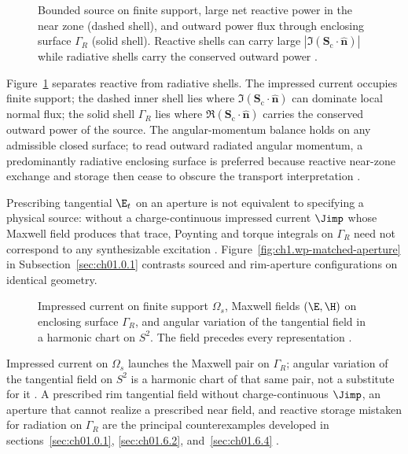 \begin{figure}[t]
\centering
\VolIPhysFig{\VolIPhysReactiveVsRadiative}
\caption{Bounded source on finite support, large net reactive power in the near zone (dashed shell), and outward power flux through enclosing surface $\Gamma_R$ (solid shell). Reactive shells can carry large $|\Im(\mathbf{S}_\mathrm{c}\cdot\hat{\mathbf{n}})|$ while radiative shells carry the conserved outward power \cite{poynting1884,chu1948}.}
\label{fig:ch1.master-philosophy}
\end{figure}

Figure~\ref{fig:ch1.master-philosophy} separates reactive from radiative shells.
The impressed current occupies finite support; the dashed inner shell lies where
$\Im(\mathbf{S}_\mathrm{c}\cdot\hat{\mathbf{n}})$ can dominate local normal
flux; the solid shell $\Gamma_R$ lies where
$\Re(\mathbf{S}_\mathrm{c}\cdot\hat{\mathbf{n}})$ carries the conserved outward power of the
source. The angular-momentum balance holds on any admissible closed surface; to read outward radiated angular momentum, a predominantly radiative enclosing surface is preferred because reactive near-zone exchange and storage then cease to obscure the transport interpretation \cite{chu1948,stratton1941}.

Prescribing tangential $\E_t$ on an aperture is not equivalent to specifying a physical source: without a charge-continuous impressed current $\Jimp$ whose Maxwell field produces that trace, Poynting and torque integrals on $\Gamma_R$ need not correspond to any synthesizable excitation \cite{stratton1941,harrington2001}. Figure~\ref{fig:ch1.wp-matched-aperture} in Subsection~\ref{sec:ch01.0.1} contrasts sourced and rim-aperture configurations on identical geometry.
\label{thm:ch1.realizability-hierarchy}\label{prin:ch1.rep-physics}\label{def:ch1.hierarchy-classes}\label{hier:ch1.angular-status}

\begin{figure}[t]
\centering
\VolIPhysFig{\VolIPhysThreeLevelHierarchy}
\caption{Impressed current on finite support $\Omega_s$, Maxwell fields $(\E,\H)$ on enclosing surface $\Gamma_R$, and angular variation of the tangential field in a harmonic chart on $S^2$. The field precedes every representation \cite{stratton1941}.}
\label{fig:ch1.three-level-hierarchy}
\end{figure}

Impressed current on $\Omega_s$ launches the Maxwell pair on $\Gamma_R$; angular variation of the tangential field on $S^2$ is a harmonic chart of that same pair, not a substitute for it \cite{stratton1941,harrington2001}.
A prescribed rim tangential field without charge-continuous $\Jimp$, an aperture that cannot realize a prescribed near field, and reactive storage mistaken for radiation on $\Gamma_R$ are the principal counterexamples developed in sections~\ref{sec:ch01.0.1}, \ref{sec:ch01.6.2}, and~\ref{sec:ch01.6.4} \cite{stratton1941}.
\label{prin:ch1.finite-geometry-angular}\label{prin:ch1.accessibility}

